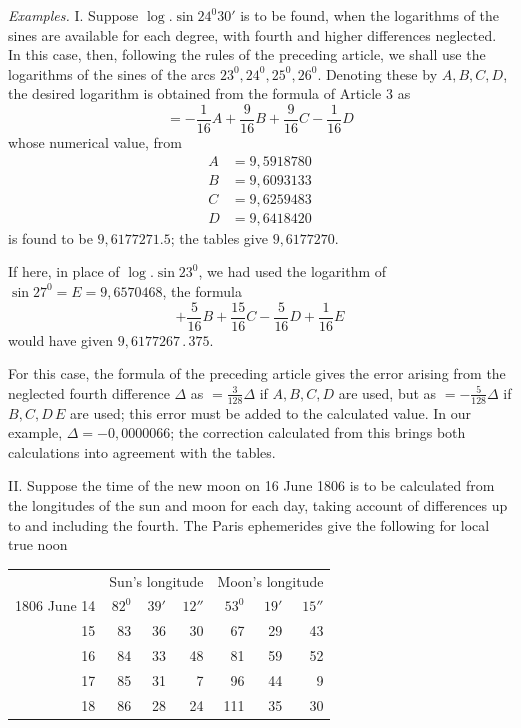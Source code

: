 \emph{Examples.} I. Suppose \(\log.\sin 24^{0}30'\) is to be found, when the logarithms of the sines are available for each degree, with fourth and higher differences neglected. In
this case, then, following the rules of the preceding article, we shall use the logarithms of the sines
of the arcs \(23^{0},24^{0},25^{0},26^{0}\). Denoting these by \(A,B,C,D\), the desired logarithm is obtained from the formula of Article 3 as
\[
=-\frac{1}{16}A+\frac{9}{16}B+\frac{9}{16}C-\frac{1}{16}D
\]
whose numerical value, from
\[
\begin{aligned}
A&=9{,}5918780\\
B&=9{,}6093133\\
C&=9{,}6259483\\
D&=9{,}6418420
\end{aligned}
\]
is found to be \(9{,}6177271.5\); the tables give \(9{,}6177270\).

If here, in place of \(\log.\sin 23^{0}\), we had used the logarithm of \(\sin 27^{0}=E=9{,}6570468\), the formula
\[
+\frac{5}{16}B+\frac{15}{16}C-\frac{5}{16}D+\frac{1}{16}E
\]
would have given \(9{,}6177267\,.\,375\).

For this case, the formula of the preceding article gives the error arising from the neglected fourth difference
\(\Delta\) as \(=\frac{3}{128}\Delta\) if \(A,B,C,D\) are used, but as \(=-\frac{5}{128}\Delta\) if \(B,C,D\)\raisebox{-0.3ex}{:}\,\(E\) are used; this error must be added to the calculated value. In our example,
\(\Delta=-0{,}0000066\); the correction calculated from this brings both calculations into agreement with the tables.

II. Suppose the time of the new moon on 16 June 1806 is to be calculated from the longitudes of the sun and moon for
each day, taking account of differences up to and including the fourth.
The Paris ephemerides give the following for local true noon

\begin{center}
\begin{tabular}{r@{\qquad}rrr@{\qquad}rrr}
&\multicolumn{3}{c}{Sun's longitude}&\multicolumn{3}{c}{Moon's longitude}\\
1806 June 14&\(82^{0}\)&\(39'\)&\(12''\)&\(53^{0}\)&\(19'\)&\(15''\)\\
15&83&36&30&67&29&43\\
16&84&33&48&81&59&52\\
17&85&31&7&96&44&9\\
18&86&28&24&111&35&30
\end{tabular}
\end{center}

